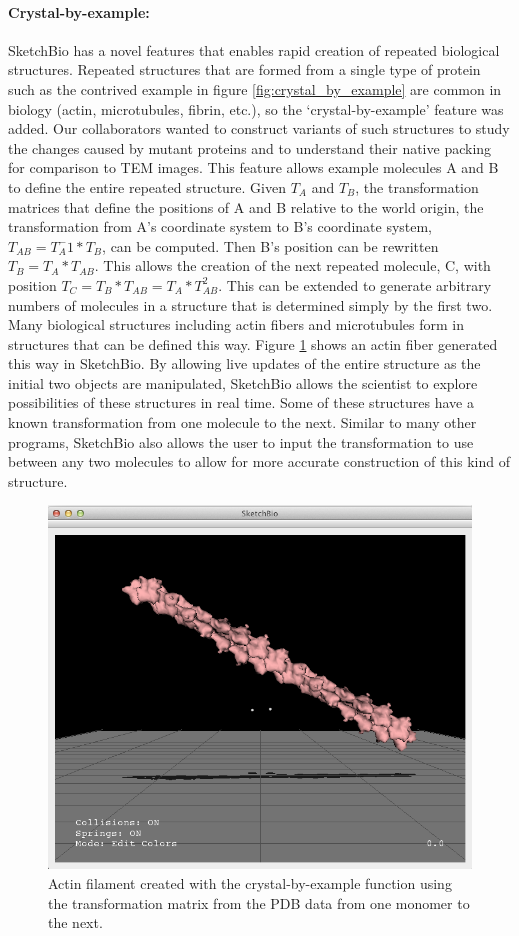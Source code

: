 \documentclass[twocolumn]{bmcart}%
\begin{document}
\paragraph*{Crystal-by-example:}
SketchBio has a novel features that enables rapid creation of repeated biological structures.  Repeated structures that are formed from a single type of protein such as the contrived example in figure \ref{fig:crystal_by_example} are common in biology (actin, microtubules, fibrin, etc.), so the ‘crystal-by-example' feature was added.  Our collaborators wanted to construct variants of such structures to study the changes caused by mutant proteins and to understand their native packing for comparison to TEM images.  This feature allows example molecules A and B to define the entire repeated structure.  Given $T_A$ and $T_B$, the transformation matrices that define the positions of A and B relative to the world origin, the transformation from A's coordinate system to B's coordinate system, $T_{AB} = T_A^-1*T_B$, can be computed.  Then B's position can be rewritten $T_B = T_A*T_{AB}$.  This allows the creation of the next repeated molecule, C, with position $T_C = T_B*T_{AB} = T_A*T_{AB}^2$.  This can be extended to generate arbitrary numbers of molecules in a structure that is determined simply by the first two.  Many biological structures including actin fibers and microtubules form in structures that can be defined this way.  Figure \ref{fig:crystal_actin} shows an actin fiber generated this way in SketchBio.  By allowing live updates of the entire structure as the initial two objects are manipulated, SketchBio allows the scientist to explore possibilities of these structures in real time.  Some of these structures have a known transformation from one molecule to the next.  Similar to many other programs, SketchBio also allows the user to input the transformation to use between any two molecules to allow for more accurate construction of this kind of structure.

\begin{figure}[h]
\centering
\includegraphics[width=0.9\columnwidth]{crystal_actin.png}
\caption{Actin filament created with the crystal-by-example function using the transformation matrix from the PDB data from one monomer to the next.}
\label{fig:crystal_actin}
\end{figure}
\end{document}
